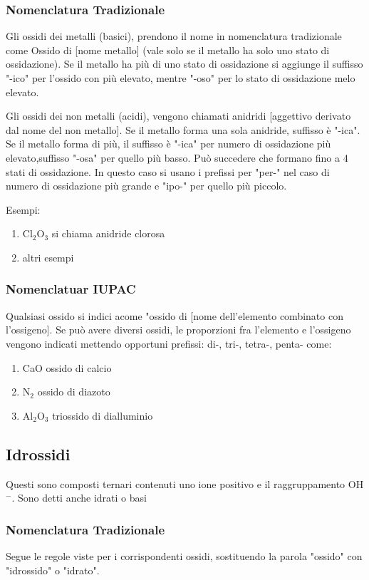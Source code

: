 \documentclass[a4paper]{article}
\begin{document}
\subsubsection{Nomenclatura Tradizionale}
Gli ossidi dei metalli (basici), prendono il nome in nomenclatura tradizionale come Ossido di [nome metallo] (vale solo se il metallo ha solo uno stato di ossidazione). 
Se il metallo ha più di uno stato di ossidazione si aggiunge il suffisso "-ico" per l'ossido con più elevato, mentre "-oso" per lo stato di ossidazione melo elevato. 

Gli ossidi dei non metalli (acidi), vengono chiamati anidridi [aggettivo derivato dal nome del non metallo]. Se il metallo forma una sola anidride, suffisso è "-ica". Se il metallo forma di più, il suffisso è "-ica" per numero di ossidazione più elevato,suffisso "-osa" per quello più basso. Può succedere che formano fino a 4 stati di ossidazione. In questo caso si usano i prefissi per "per-" nel caso di numero di ossidazione più grande e "ipo-" per quello più piccolo. 

Esempi: 
\begin{enumerate}
    \item Cl$_2$O$_3$ si chiama anidride clorosa
    \item altri esempi
\end{enumerate} 

\subsubsection{Nomenclatuar IUPAC}
Qualsiasi ossido si indici acome "ossido di [nome dell'elemento combinato con l'ossigeno]. Se può avere diversi ossidi, le proporzioni fra l'elemento e l'ossigeno vengono indicati mettendo opportuni prefissi: di-, tri-, tetra-, penta- come:
\begin{enumerate}
    \item CaO ossido di calcio
    \item N$_2$ ossido di diazoto
    \item Al$_2$O$_3$ triossido di dialluminio
\end{enumerate}

\subsection{Idrossidi}
Questi sono composti ternari contenuti uno ione positivo e il raggruppamento OH$^-$. Sono detti anche idrati o basi

\subsubsection{Nomenclatura Tradizionale}
Segue le regole viste per i corrispondenti ossidi, sostituendo la parola "ossido" con "idrossido" o "idrato". 
\end{document}

